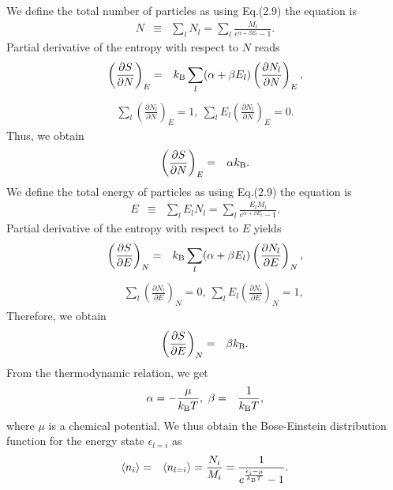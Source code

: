 \documentclass[12pt,a4paper]{report} %
\newcommand{\kb} {k_{\rm B}}				%
\begin{document}
We define the total number of particles as using Eq.(2.9) the equation is
\begin{eqnarray}
N & \equiv & \sum_l N_l = \sum_l \frac{M_l}{e^{\alpha + \beta E_l} -1}.
\end{eqnarray}
Partial derivative of the entropy with respect to $N$ reads
\begin{eqnarray}
\left( \frac{\partial S}{\partial N} \right)_E & = &
\kb \sum_l (\alpha + \beta E_l) \left( \frac{\partial N_l}{\partial N} \right)_E,
\end{eqnarray}
\begin{eqnarray}
\sum_l \left( \frac{\partial N_l}{\partial N} \right)_E = 1,
\ \sum_l E_l \left( \frac{\partial N_l}{\partial N} \right)_E = 0.
\end{eqnarray}
Thus, we obtain
\begin{eqnarray}
\left( \frac{\partial S}{\partial N} \right)_E & = & \alpha \kb.
\end{eqnarray}
We define the total energy of particles as using Eq.(2.9) the equation is
\begin{eqnarray}
E & \equiv & \sum_l E_l N_l = \sum_l \frac{E_l M_l}{e^{\alpha + \beta E_l} -1}.
\end{eqnarray}
Partial derivative of the entropy with respect to $E$ yields
\begin{eqnarray}
\left( \frac{\partial S}{\partial E} \right)_N & = &
\kb \sum_l (\alpha + \beta E_l) \left( \frac{\partial N_l}{\partial E} \right)_N,
\end{eqnarray}
\begin{eqnarray}
& & \sum_l \left( \frac{\partial N_l}{\partial E} \right)_N = 0,
\ \sum_l E_l \left( \frac{\partial N_l}{\partial E} \right)_N = 1,
\end{eqnarray}
Therefore, we obtain
\begin{eqnarray}
\left( \frac{\partial S}{\partial E} \right)_N & = & \beta \kb.
\end{eqnarray}
From the thermodynamic relation, we get
\begin{eqnarray}
\alpha = - \frac{\mu}{\kb T}
, \ \beta & = & \frac{1}{\kb T},
\end{eqnarray}
where $\mu$ is a chemical potential. We thus obtain the Bose-Einstein distribution function for the energy state $\epsilon_{l=i}$ as
\begin{eqnarray}
\langle n_i \rangle & = & \langle n_{l=i} \rangle = \frac{N_i}{M_i} = \frac{1}{e^{\frac{\epsilon_i - \mu}{\kb T}} - 1}.
\end{eqnarray}
\end{document}
